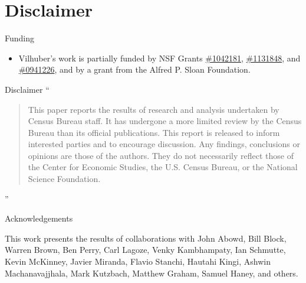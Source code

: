 \section{Disclaimer}
\begin{frame}
\begin{block}{Funding}
\begin{itemize}
\item Vilhuber's work is partially funded by NSF Grants 
\href{http://www.nsf.gov/awardsearch/showAward.do?AwardNumber=1042181}{\#1042181}, \href{http://www.nsf.gov/awardsearch/showAward.do?AwardNumber=1131848}{\#1131848},
and 
\href{http://www.nsf.gov/awardsearch/showAward.do?AwardNumber=0941226}{\#0941226}, and by a grant from the Alfred P. Sloan Foundation.

\end{itemize}
\end{block}
\begin{block}{Disclaimer}
\huge ``
\begin{quote}
\footnotesize This paper reports the results of research and analysis 
undertaken by Census Bureau staff. It has undergone a more limited review by the Census Bureau than its 
official publications. This report is released to inform interested parties and to encourage discussion. Any 
findings, conclusions or opinions are those of the authors. They do not necessarily reflect those of the Center for 
Economic Studies, the U.S. Census Bureau, or the National Science Foundation. 
\end{quote}
\flushright ''
\end{block}
\end{frame}


\begin{frame}{Acknowledgements}
\begin{block}{This work presents the results of collaborations with}
John Abowd, Bill Block, Warren Brown, Ben Perry, Carl Lagoze, Venky Kambhampaty, Ian Schmutte, Kevin McKinney, Javier Miranda, Flavio Stanchi, Hautahi Kingi, Ashwin Machanavajjhala, Mark Kutzbach, Matthew
Graham, Samuel Haney, and others.
\end{block}
\end{frame}


